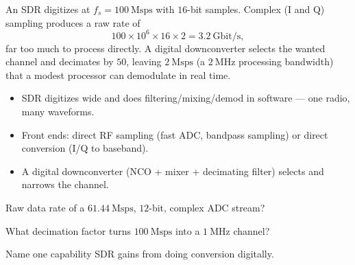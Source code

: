 \begin{workedexample}
An SDR digitizes at $f_s = 100\ \text{Msps}$ with $16$-bit samples. Complex
(I and Q) sampling produces a raw rate of
\[ 100\times10^{6}\times16\times2 = 3.2\ \text{Gbit/s}, \]
far too much to process directly. A digital downconverter selects the wanted
channel and decimates by $50$, leaving $2\ \text{Msps}$ (a $2\ \text{MHz}$
processing bandwidth) that a modest processor can demodulate in real time.
\end{workedexample}

\begin{keytakeaways}
\begin{itemize}[leftmargin=1.4em,itemsep=2pt]
\item SDR digitizes wide and does filtering/mixing/demod in software --- one radio, many waveforms.
\item Front ends: direct RF sampling (fast ADC, bandpass sampling) or direct conversion (I/Q to baseband).
\item A digital downconverter (NCO + mixer + decimating filter) selects and narrows the channel.
\end{itemize}
\end{keytakeaways}

\begin{exercises}
\item Raw data rate of a $61.44\ \text{Msps}$, $12$-bit, complex ADC stream?
\item What decimation factor turns $100\ \text{Msps}$ into a $1\ \text{MHz}$ channel?
\item Name one capability SDR gains from doing conversion digitally.
\end{exercises}

